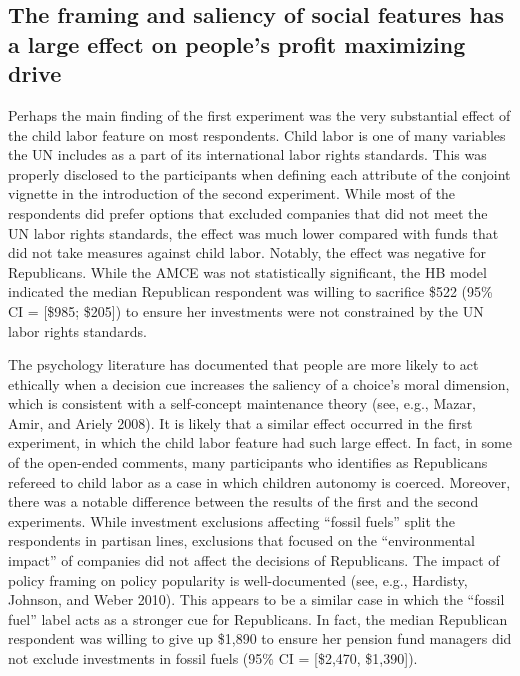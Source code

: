 \documentclass[
  12pt,
]{article}
\begin{document}
\hypertarget{the-framing-and-saliency-of-social-features-has-a-large-effect-on-peoples-profit-maximizing-drive}{%
\subsection{The framing and saliency of social features has a large effect on people's profit maximizing drive}\label{the-framing-and-saliency-of-social-features-has-a-large-effect-on-peoples-profit-maximizing-drive}}

Perhaps the main finding of the first experiment was the very substantial effect of the child labor feature on most respondents. Child labor is one of many variables the UN includes as a part of its international labor rights standards. This was properly disclosed to the participants when defining each attribute of the conjoint vignette in the introduction of the second experiment. While most of the respondents did prefer options that excluded companies that did not meet the UN labor rights standards, the effect was much lower compared with funds that did not take measures against child labor. Notably, the effect was negative for Republicans. While the AMCE was not statistically significant, the HB model indicated the median Republican respondent was willing to sacrifice \$522 (95\% CI = {[}\$985; \$205{]}) to ensure her investments were not constrained by the UN labor rights standards.

The psychology literature has documented that people are more likely to act ethically when a decision cue increases the saliency of a choice's moral dimension, which is consistent with a self-concept maintenance theory (see, e.g., Mazar, Amir, and Ariely 2008). It is likely that a similar effect occurred in the first experiment, in which the child labor feature had such large effect. In fact, in some of the open-ended comments, many participants who identifies as Republicans refereed to child labor as a case in which children autonomy is coerced. Moreover, there was a notable difference between the results of the first and the second experiments. While investment exclusions affecting ``fossil fuels'' split the respondents in partisan lines, exclusions that focused on the ``environmental impact'' of companies did not affect the decisions of Republicans. The impact of policy framing on policy popularity is well-documented (see, e.g., Hardisty, Johnson, and Weber 2010). This appears to be a similar case in which the ``fossil fuel'' label acts as a stronger cue for Republicans. In fact, the median Republican respondent was willing to give up \$1,890 to ensure her pension fund managers did not exclude investments in fossil fuels (95\% CI = {[}\$2,470, \$1,390{]}).
\end{document}

